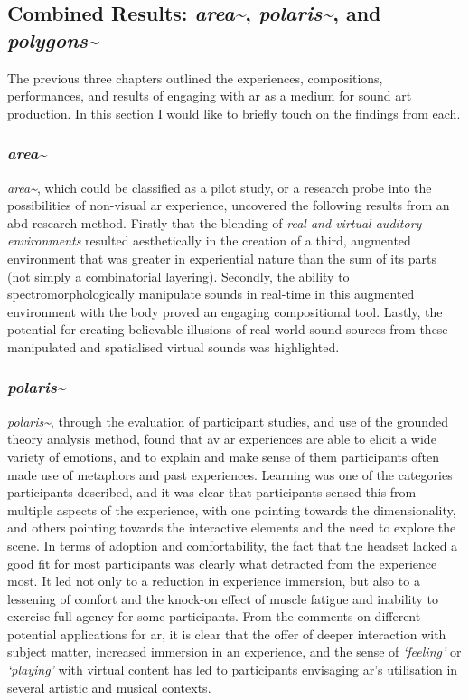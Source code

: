\subsection{Combined Results: \textit{area\textasciitilde{}}, \textit{polaris\textasciitilde{}}, and \textit{polygons\textasciitilde{}}}
The previous three chapters outlined the experiences, compositions, performances, and results of engaging with \gls{ar} as a medium for sound \gls{art} production. In this section I would like to briefly touch on the findings from each.

\subsubsection{\textit{area\textasciitilde{}}}
\textit{area\textasciitilde{}}, which could be classified as a pilot study, or a research probe into the possibilities of non-visual \gls{ar} experience, uncovered the following results from an \gls{abd} research method. Firstly that the blending of \textit{real and virtual auditory environments} resulted aesthetically in the creation of a third, augmented environment that was greater in experiential nature than the sum of its parts (not simply a combinatorial layering). Secondly, the ability to spectromorphologically manipulate sounds in real-time in this augmented environment with the body proved an engaging compositional tool. Lastly, the potential for creating believable illusions of real-world sound sources from these manipulated and spatialised virtual sounds was highlighted.

\subsubsection{\textit{polaris\textasciitilde{}}}
\textit{polaris\textasciitilde{}}, through the evaluation of participant studies, and use of the grounded theory analysis method, found that \gls{av} \gls{ar} experiences are able to elicit a wide variety of emotions, and to explain and make sense of them participants often made use of metaphors and past experiences. Learning was one of the categories participants described, and it was clear that participants sensed this from multiple aspects of the experience, with one pointing towards the dimensionality, and others pointing towards the interactive elements and the need to explore the scene. In terms of adoption and comfortability, the fact that the headset lacked a good fit for most participants was clearly what detracted from the experience most. It led not only to a reduction in experience immersion, but also to a lessening of comfort and the knock-on effect of muscle fatigue and inability to exercise full agency for some participants. From the comments on different potential applications for \gls{ar}, it is clear that the offer of deeper interaction with subject matter, increased immersion in an experience, and the sense of \textit{`feeling'} or \textit{`playing'} with virtual content has led to participants envisaging \gls{ar}'s utilisation in several artistic and musical contexts. 

